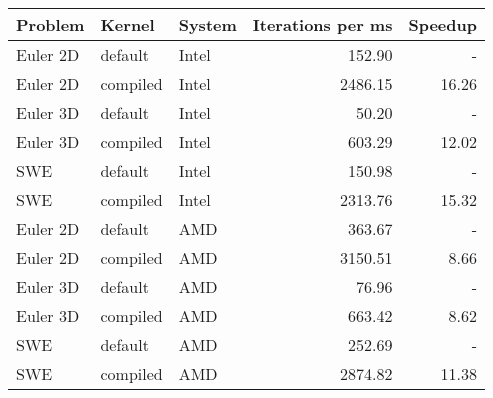 \begin{tabular}{lllrr}
\toprule
Problem & Kernel & System & Iterations per ms & Speedup \\
\midrule
Euler 2D & default & Intel & 152.90 & - \\
Euler 2D & compiled & Intel & 2486.15 & 16.26 \\
Euler 3D & default & Intel & 50.20 & - \\
Euler 3D & compiled & Intel & 603.29 & 12.02 \\
SWE & default & Intel & 150.98 & - \\
SWE & compiled & Intel & 2313.76 & 15.32 \\
Euler 2D & default & AMD & 363.67 & - \\
Euler 2D & compiled & AMD & 3150.51 & 8.66 \\
Euler 3D & default & AMD & 76.96 & - \\
Euler 3D & compiled & AMD & 663.42 & 8.62 \\
SWE & default & AMD & 252.69 & - \\
SWE & compiled & AMD & 2874.82 & 11.38 \\
\bottomrule
\end{tabular}
